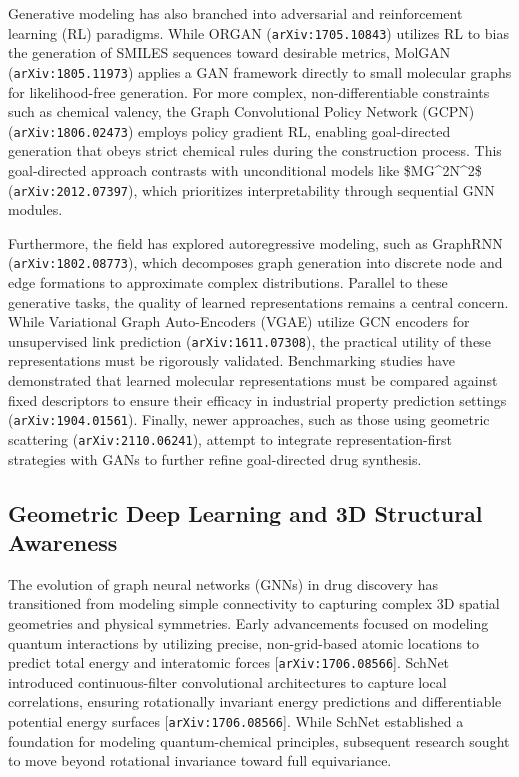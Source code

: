 \documentclass[11pt]{article}
\begin{document}
Generative modeling has also branched into adversarial and reinforcement learning (RL) paradigms. While ORGAN (\texttt{arXiv:1705.10843}) utilizes RL to bias the generation of SMILES sequences toward desirable metrics, MolGAN (\texttt{arXiv:1805.11973}) applies a GAN framework directly to small molecular graphs for likelihood-free generation. For more complex, non-differentiable constraints such as chemical valency, the Graph Convolutional Policy Network (GCPN) (\texttt{arXiv:1806.02473}) employs policy gradient RL, enabling goal-directed generation that obeys strict chemical rules during the construction process. This goal-directed approach contrasts with unconditional models like \$MG\textasciicircum{}2N\textasciicircum{}2\$ (\texttt{arXiv:2012.07397}), which prioritizes interpretability through sequential GNN modules.

Furthermore, the field has explored autoregressive modeling, such as GraphRNN (\texttt{arXiv:1802.08773}), which decomposes graph generation into discrete node and edge formations to approximate complex distributions. Parallel to these generative tasks, the quality of learned representations remains a central concern. While Variational Graph Auto-Encoders (VGAE) utilize GCN encoders for unsupervised link prediction (\texttt{arXiv:1611.07308}), the practical utility of these representations must be rigorously validated. Benchmarking studies have demonstrated that learned molecular representations must be compared against fixed descriptors to ensure their efficacy in industrial property prediction settings (\texttt{arXiv:1904.01561}). Finally, newer approaches, such as those using geometric scattering (\texttt{arXiv:2110.06241}), attempt to integrate representation-first strategies with GANs to further refine goal-directed drug synthesis.

\subsection{Geometric Deep Learning and 3D Structural Awareness}

The evolution of graph neural networks (GNNs) in drug discovery has transitioned from modeling simple connectivity to capturing complex 3D spatial geometries and physical symmetries. Early advancements focused on modeling quantum interactions by utilizing precise, non-grid-based atomic locations to predict total energy and interatomic forces [\texttt{arXiv:1706.08566}]. SchNet introduced continuous-filter convolutional architectures to capture local correlations, ensuring rotationally invariant energy predictions and differentiable potential energy surfaces [\texttt{arXiv:1706.08566}]. While SchNet established a foundation for modeling quantum-chemical principles, subsequent research sought to move beyond rotational invariance toward full equivariance.
\end{document}
